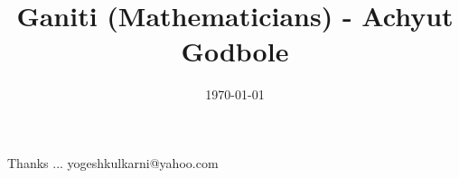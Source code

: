 \documentclass[xcolor=dvipsnames,compress,t,pdf]{beamer}
\title[Ganiti \hspace{4cm} \insertframenumber /\inserttotalframenumber]
{Ganiti (Mathematicians) - Achyut Godbole}
\subtitle[]{}
\date[2014]{\today}
\begin{document}
	\begin{frame}
	\titlepage
	\end{frame}
	
	
	
	\begin{frame}[c]{}
	Thanks ...
	\vspace{5mm}
	yogeshkulkarni@yahoo.com
	\end{frame}
\end{document}
